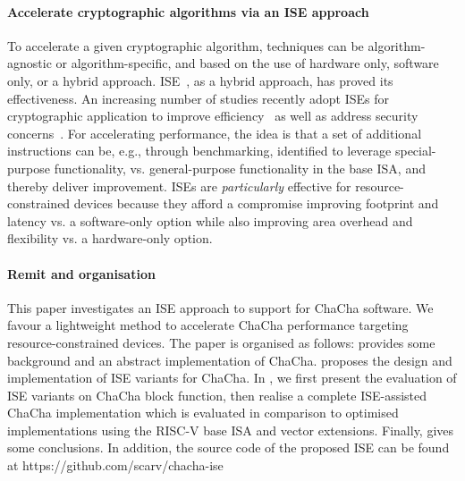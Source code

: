 \paragraph{Accelerate cryptographic algorithms via an ISE approach}
To accelerate a given cryptographic algorithm, techniques can be algorithm-agnostic or algorithm-specific, and based on the use of hardware only, software only, or a hybrid approach. 
ISE~\cite{GalBer:11,BarGioMar:09,RegIen:16}, as a hybrid approach, has proved its effectiveness. 
An increasing number of studies recently adopt ISEs for cryptographic application to improve efficiency~\cite{RCB:20,MNPSW:21} as well as address security concerns~\cite{GMPP:20}. 
For accelerating performance, the idea is that a set of additional instructions can be, e.g., through benchmarking, identified to leverage special-purpose functionality, 
vs. general-purpose functionality in the base ISA, and thereby deliver improvement.
ISEs are {\em particularly} effective for resource-constrained devices 
because they afford a compromise improving footprint and latency vs. a software-only option 
while also improving area overhead and flexibility vs. a hardware-only option.

\paragraph{Remit and organisation}
This paper investigates an ISE approach to support for ChaCha software. We favour a lightweight method to accelerate ChaCha performance targeting resource-constrained devices. The paper is organised as follows:
 provides some background and an abstract implementation of ChaCha.
 proposes the design and implementation of ISE variants for ChaCha. 
In , we first present the evaluation of ISE variants on ChaCha block function, then realise a complete ISE-assisted ChaCha implementation which is evaluated in comparison to optimised implementations using the RISC-V base ISA and vector extensions. 
Finally,  gives some conclusions. In addition, the source code of the proposed ISE can be found at https://github.com/scarv/chacha-ise
